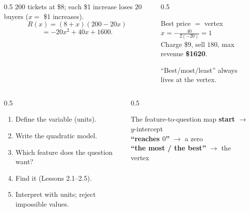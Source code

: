 \documentclass[aspectratio=169, 11pt]{beamer}
\begin{document}
\begin{frame}[t, plain]
  \begin{columns}[T]
    \begin{column}{0.5\textwidth}
      $200$ tickets at \$8; each \$1 increase loses $20$ buyers ($x=$ \$1 increases).
      \[ R(x)=(8+x)(200-20x) \]
      \[ =-20x^2+40x+1600. \]
    \end{column}
    \begin{column}{0.5\textwidth}
      \begin{block}{Best price $=$ vertex}
        $x=-\tfrac{40}{2(-20)}=1$ \\[2pt]
        Charge \$9, sell $180$, max revenue \textbf{\$1620}.
      \end{block}
      \small ``Best/most/least'' always lives at the vertex.
    \end{column}
  \end{columns}
\end{frame}

\begin{frame}[t, plain]
  \begin{columns}[T]
    \begin{column}{0.5\textwidth}
      \begin{enumerate}\setlength{\itemsep}{3pt}
        \item Define the variable (units).
        \item Write the quadratic model.
        \item Which feature does the question want?
        \item Find it (Lessons 2.1--2.5).
        \item Interpret with units; reject impossible values.
      \end{enumerate}
    \end{column}
    \begin{column}{0.5\textwidth}
      \begin{block}{The feature-to-question map}
        \textbf{start} $\to$ $y$-intercept \\
        \textbf{``reaches $0$''} $\to$ a zero \\
        \textbf{``the most / the best''} $\to$ the vertex
      \end{block}
    \end{column}
  \end{columns}
\end{frame}
\end{document}
